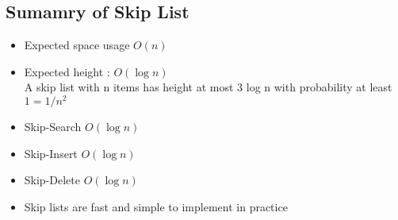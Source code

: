 \documentclass{article}
\begin{document}
\subsection*{Sumamry of Skip List}
\begin{itemize}
\item Expected space usage \(O(n)\)
\item Expected height : \(O(\log n)\)\\
A skip list with n items has height at most 3 log n with probability at least \(1 = 1 / n^2\)
\item Skip-Search \(O(\log n)\)
\item Skip-Insert \(O(\log n)\)
\item Skip-Delete \(O(\log n)\)
\item Skip lists are fast and simple to implement in practice
\end{itemize}
\end{document}
